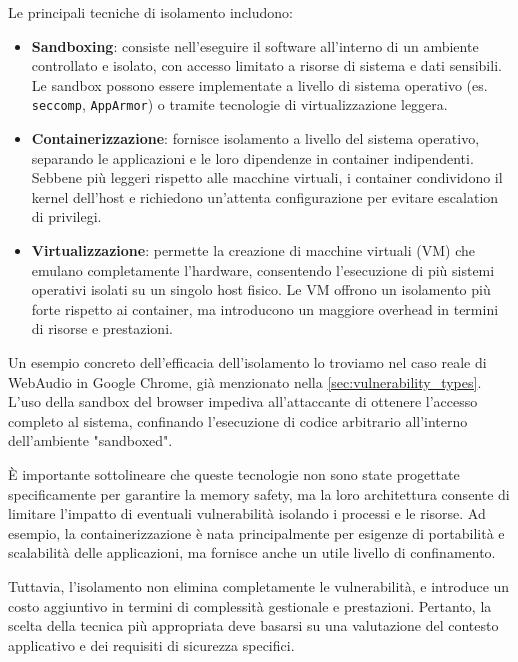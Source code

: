 Le principali tecniche di isolamento includono:
\begin{itemize}
  \item \textbf{Sandboxing}: consiste nell'eseguire il software all'interno di un
    ambiente controllato e isolato, con accesso limitato a risorse di sistema e
    dati sensibili. Le sandbox possono essere implementate a livello di sistema operativo
    (es. \texttt{seccomp}, \texttt{AppArmor}) o tramite tecnologie di virtualizzazione
    leggera.

  \item \textbf{Containerizzazione}: fornisce isolamento a livello del sistema operativo,
    separando le applicazioni e le loro dipendenze in container indipendenti. Sebbene
    più leggeri rispetto alle macchine virtuali, i container condividono il
    kernel dell'host e richiedono un'attenta configurazione per evitare
    escalation di privilegi.

  \item \textbf{Virtualizzazione}: permette la creazione di macchine virtuali (VM)
    che emulano completamente l'hardware, consentendo l'esecuzione di più
    sistemi operativi isolati su un singolo host fisico. Le VM offrono un isolamento
    più forte rispetto ai container, ma introducono un maggiore overhead in
    termini di risorse e prestazioni.
\end{itemize}

Un esempio concreto dell'efficacia dell'isolamento lo troviamo nel caso reale di
WebAudio in Google Chrome, già menzionato nella
\autoref{sec:vulnerability_types}. L'uso della sandbox del browser impediva all'attaccante
di ottenere l'accesso completo al sistema, confinando l'esecuzione di codice
arbitrario all'interno dell'ambiente "sandboxed".\cite{webaudio_uaf}

È importante sottolineare che queste tecnologie non sono state progettate specificamente
per garantire la memory safety, ma la loro architettura consente di limitare l'impatto
di eventuali vulnerabilità isolando i processi e le risorse. Ad esempio, la
containerizzazione è nata principalmente per esigenze di portabilità e
scalabilità delle applicazioni, ma fornisce anche un utile livello di confinamento.

Tuttavia, l'isolamento non elimina completamente le vulnerabilità, e introduce un
costo aggiuntivo in termini di complessità gestionale e prestazioni. Pertanto, la
scelta della tecnica più appropriata deve basarsi su una valutazione del contesto
applicativo e dei requisiti di sicurezza specifici.